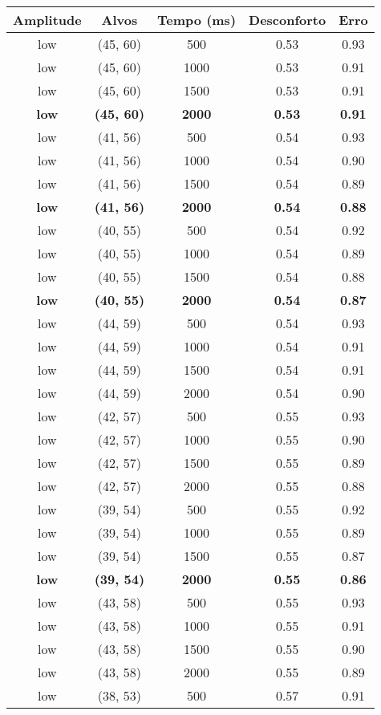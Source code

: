 \begin{tabular}{c c c c c}
\hline
Amplitude & Alvos & Tempo (ms) & Desconforto & Erro \\
\hline
low & (45, 60) &  500 & 0.53 & 0.93 \\
low & (45, 60) &  1000 & 0.53 & 0.91 \\
low & (45, 60) &  1500 & 0.53 & 0.91 \\
\textbf{low} & \textbf{(45, 60)} & \textbf{ 2000} & \textbf{0.53} & \textbf{0.91} \\
low & (41, 56) &  500 & 0.54 & 0.93 \\
low & (41, 56) &  1000 & 0.54 & 0.90 \\
low & (41, 56) &  1500 & 0.54 & 0.89 \\
\textbf{low} & \textbf{(41, 56)} & \textbf{ 2000} & \textbf{0.54} & \textbf{0.88} \\
low & (40, 55) &  500 & 0.54 & 0.92 \\
low & (40, 55) &  1000 & 0.54 & 0.89 \\
low & (40, 55) &  1500 & 0.54 & 0.88 \\
\textbf{low} & \textbf{(40, 55)} & \textbf{ 2000} & \textbf{0.54} & \textbf{0.87} \\
low & (44, 59) &  500 & 0.54 & 0.93 \\
low & (44, 59) &  1000 & 0.54 & 0.91 \\
low & (44, 59) &  1500 & 0.54 & 0.91 \\
low & (44, 59) &  2000 & 0.54 & 0.90 \\
low & (42, 57) &  500 & 0.55 & 0.93 \\
low & (42, 57) &  1000 & 0.55 & 0.90 \\
low & (42, 57) &  1500 & 0.55 & 0.89 \\
low & (42, 57) &  2000 & 0.55 & 0.88 \\
low & (39, 54) &  500 & 0.55 & 0.92 \\
low & (39, 54) &  1000 & 0.55 & 0.89 \\
low & (39, 54) &  1500 & 0.55 & 0.87 \\
\textbf{low} & \textbf{(39, 54)} & \textbf{ 2000} & \textbf{0.55} & \textbf{0.86} \\
low & (43, 58) &  500 & 0.55 & 0.93 \\
low & (43, 58) &  1000 & 0.55 & 0.91 \\
low & (43, 58) &  1500 & 0.55 & 0.90 \\
low & (43, 58) &  2000 & 0.55 & 0.89 \\
low & (38, 53) &  500 & 0.57 & 0.91 \\

\end{tabular}
